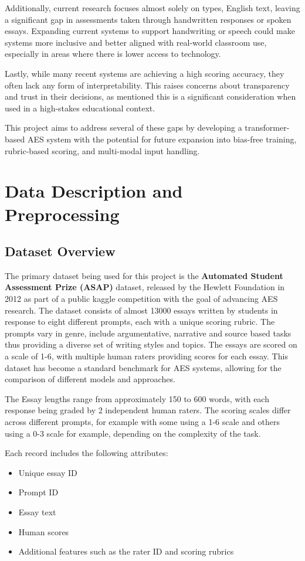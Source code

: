 \documentclass[10pt]{report}
\begin{document}
Additionally, current research focuses almost solely on types, English text, leaving a significant gap in assessments taken through handwritten responses or spoken essays. Expanding current systems to support handwriting or speech could make systems more inclusive and better aligned with real-world classroom use, especially in areas where there is lower access to technology.

Lastly, while many recent systems are achieving a high scoring accuracy, they often lack any form of interpretability. This raises concerns about transparency and trust in their decisions, as mentioned this is a significant consideration when used in a high-stakes educational context. 

This project aims to address several of these gaps by developing a transformer-based AES system with the potential for future expansion into bias-free training, rubric-based scoring, and multi-modal input handling.



\chapter{Data Description and Preprocessing}
\section{Dataset Overview}
The primary dataset being used for this project is the \textbf{Automated Student Assessment Prize (ASAP)} dataset, released by the Hewlett Foundation in 2012 as part of a public kaggle competition with the goal of advancing 
AES research. The dataset consists of almost 13000 essays written by students in response to eight different prompts, each with a unique scoring rubric. The prompts vary in genre, include argumentative, narrative and source based tasks thus providing a diverse set 
of writing styles and topics. The essays are scored on a scale of 1-6, with multiple human raters providing scores for each essay. This dataset has become a standard benchmark for AES systems, allowing for the comparison of different models and approaches.

The Essay lengths range from approximately 150 to 600 words, with each response being graded by 2 independent human raters. The scoring scales differ across different prompts, for example with some using a 1-6 scale and others using a 0-3 scale for example, depending on the complexity of the task.

Each record includes the following attributes:
\begin{itemize}
    \item Unique essay ID
    \item Prompt ID
    \item Essay text
    \item Human scores
    \item Additional features such as the rater ID and scoring rubrics
\end{itemize}
\end{document}
